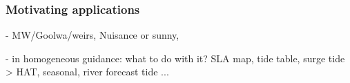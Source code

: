 \begin{frame}
\frametitle{Motivating applications}

 - MW/Goolwa/weirs, Nuisance or sunny,
 
 - in homogeneous guidance: what to do with it?
 SLA map, tide table, surge tide > HAT, seasonal, river forecast tide ...

\end{frame}